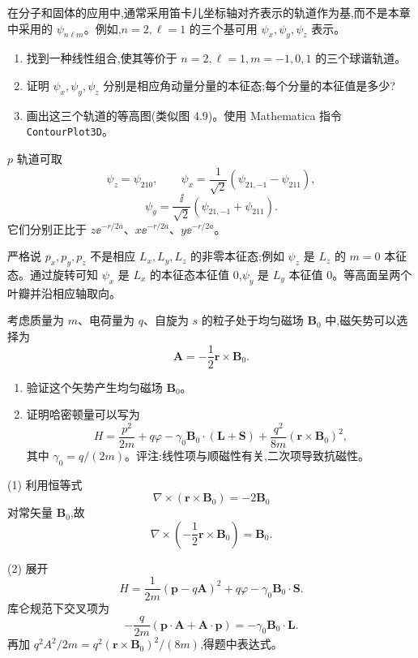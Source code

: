 \begin{question}
在分子和固体的应用中,通常采用笛卡儿坐标轴对齐表示的轨道作为基,而不是本章中采用的 $\psi_{n\ell m}$。例如,$n=2,\ell=1$ 的三个基可用 $\psi_x,\psi_y,\psi_z$ 表示。
\begin{enumerate}
\item 找到一种线性组合,使其等价于 $n=2,\ell=1,m=-1,0,1$ 的三个球谐轨道。
\item 证明 $\psi_x,\psi_y,\psi_z$ 分别是相应角动量分量的本征态;每个分量的本征值是多少?
\item 画出这三个轨道的等高图(类似图 4.9)。使用 Mathematica 指令 \texttt{ContourPlot3D}。
\end{enumerate}
\begin{solution}

$p$ 轨道可取
\[
\psi_z=\psi_{210},
\qquad
\psi_x=\frac{1}{\sqrt2}(\psi_{21,-1}-\psi_{211}),
\]
\[
\psi_y=\frac{\ii}{\sqrt2}(\psi_{21,-1}+\psi_{211}).
\]
它们分别正比于 $z \ee^{-r/2a}$、$x \ee^{-r/2a}$、$y \ee^{-r/2a}$。

严格说 $p_x,p_y,p_z$ 不是相应 $L_x,L_y,L_z$ 的非零本征态;例如 $\psi_z$ 是 $L_z$ 的 $m=0$ 本征态。通过旋转可知 $\psi_x$ 是 $L_x$ 的本征态本征值 0,$\psi_y$ 是 $L_y$ 本征值 0。等高面呈两个叶瓣并沿相应轴取向。

\end{solution}
\end{question}

\begin{question}
考虑质量为 $m$、电荷量为 $q$、自旋为 $s$ 的粒子处于均匀磁场 $\mathbf B_0$ 中,磁矢势可以选择为
\[
\mathbf A=-\frac12\mathbf r\times\mathbf B_0.
\]
\begin{enumerate}
\item 验证这个矢势产生均匀磁场 $\mathbf B_0$。
\item 证明哈密顿量可以写为
\[
H=\frac{p^2}{2m}+q\varphi-\gamma_0\mathbf B_0\cdot(\mathbf L+\mathbf S)+\frac{q^2}{8m}(\mathbf r\times\mathbf B_0)^2,
\]
其中 $\gamma_0=q/(2m)$。评注:线性项与顺磁性有关,二次项导致抗磁性。
\end{enumerate}
\begin{solution}

(1) 利用恒等式
\[
\nabla\times(\mathbf r\times\mathbf B_0)= -2\mathbf B_0
\]
对常矢量 $\mathbf B_0$,故
\[
\nabla\times\left(-\frac12\mathbf r\times\mathbf B_0\right)=\mathbf B_0.
\]

(2) 展开
\[
H=\frac{1}{2m}(\mathbf p-q\mathbf A)^2+q\varphi-\gamma_0\mathbf B_0\cdot\mathbf S.
\]
库仑规范下交叉项为
\[
-\frac{q}{2m}(\mathbf p\cdot\mathbf A+\mathbf A\cdot\mathbf p)=-\gamma_0\mathbf B_0\cdot\mathbf L.
\]
再加 $q^2A^2/2m=q^2(\mathbf r\times\mathbf B_0)^2/(8m)$,得题中表达式。

\end{solution}
\end{question}

